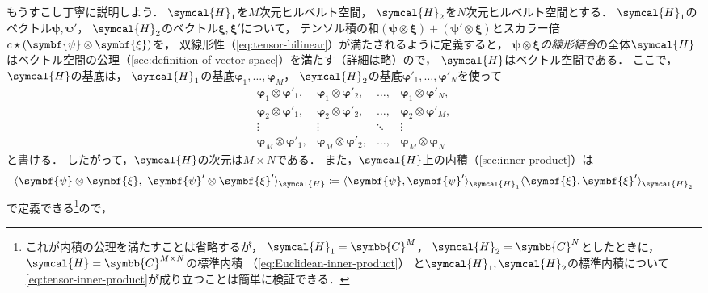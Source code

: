 \documentclass[
]{sotsu}
\newcommand{\bpsi}{\symbf{\psi}}
\newcommand{\bphi}{\symbf{\varphi}}
\newcommand{\bxi}{\symbf{\xi}}
\begin{document}
もうすこし丁寧に説明しよう．
$\symcal{H}_1$を$M$次元ヒルベルト空間，
$\symcal{H}_2$を$N$次元ヒルベルト空間とする．
$\symcal{H}_1$のベクトル$\bpsi, \bpsi'$，
$\symcal{H}_2$のベクトル$\bxi, \bxi'$について，
テンソル積の和$(\bpsi \otimes \bxi) + (\bpsi' \otimes \bxi)$とスカラー倍$c \scaprod (\bpsi \otimes \bxi)$を，
双線形性（\cref{eq:tensor-bilinear}）が満たされるように定義すると，
$\bpsi \otimes \bxi$\emph{の線形結合}の全体$\symcal{H}$はベクトル空間の公理（\cref{sec:definition-of-vector-space}）を満たす（詳細は略）ので，
$\symcal{H}$はベクトル空間である．
ここで，$\symcal{H}$の基底は，
$\symcal{H}_1$の基底$\bphi_1, \dots, \bphi_M$，
$\symcal{H}_2$の基底$\bphi'_1, \dots, \bphi'_N$を使って
\begin{equation}
    \label{eq:tensor-basis}
    \begin{array}{cccc}
        \bphi_1 \otimes \bphi'_1, 
        &  \bphi_1 \otimes \bphi'_2, 
        &  \dots, 
        &  \bphi_1 \otimes \bphi'_N, 
        \\ \bphi_2 \otimes \bphi'_1, 
        &  \bphi_2 \otimes \bphi'_2,
        &  \dots, 
        &  \bphi_2 \otimes \bphi'_M, 
        \\ \vdots 
        &  \vdots 
        &  \ddots 
        &  \vdots 
        \\ \bphi_M \otimes \bphi'_1,
        &  \bphi_M \otimes \bphi'_2,
        &  \dots,
        &  \bphi_M \otimes \bphi_N
    \end{array}
\end{equation}
と書ける．
したがって，$\symcal{H}$の次元は$M \times N$である．
また，$\symcal{H}$上の内積（\cref{sec:inner-product}）は
\begin{equation}
    \label{eq:tensor-inner-product}
    \iparen{\bpsi \otimes \bxi, \  \bpsi' \otimes \bxi'}_{\symcal{H}}
    \coloneq 
    \iparen{\bpsi, \bpsi'}_{\symcal{H}_1} \iparen{\bxi, \bxi'}_{\symcal{H}_2}
\end{equation}
で定義できる\footnote{
    これが内積の公理を満たすことは省略するが，
    $\symcal{H}_1 = \symbb{C}^M$，
    $\symcal{H}_2 = \symbb{C}^N$としたときに，
    $\symcal{H} = \symbb{C}^{M \times N}$の標準内積
    （\cref{eq:Euclidean-inner-product}）
    と$\symcal{H}_1, \symcal{H}_2$の標準内積について\cref{eq:tensor-inner-product}が成り立つことは簡単に検証できる．
}ので，
\end{document}

